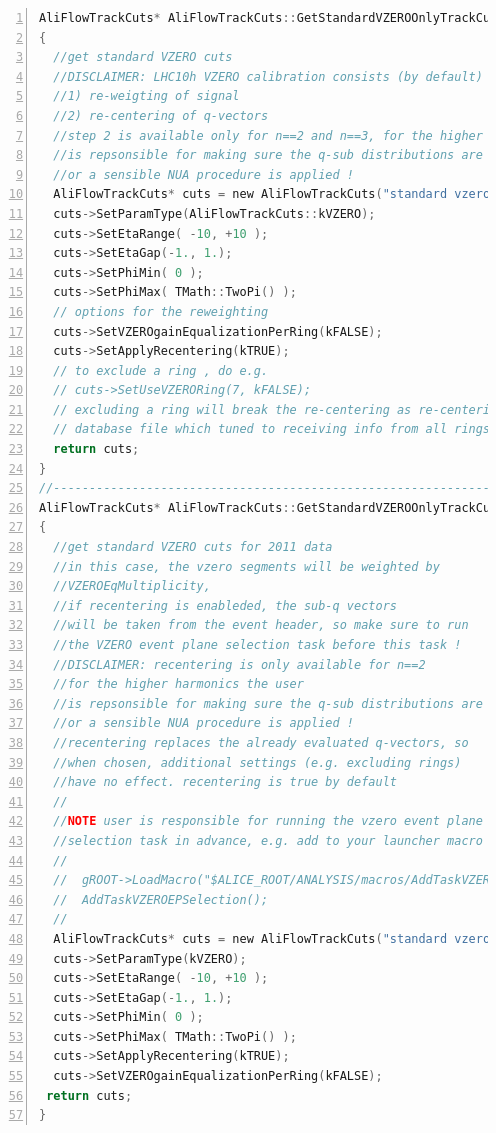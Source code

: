 \documentclass[a4paper]{book}
\numberwithin{equation}{subsection}
\begin{document}
\begin{lstlisting}[language=C, numbers=left]
AliFlowTrackCuts* AliFlowTrackCuts::GetStandardVZEROOnlyTrackCuts2010()
{
  //get standard VZERO cuts
  //DISCLAIMER: LHC10h VZERO calibration consists (by default) of two steps
  //1) re-weigting of signal
  //2) re-centering of q-vectors
  //step 2 is available only for n==2 and n==3, for the higher harmonics the user
  //is repsonsible for making sure the q-sub distributions are (sufficiently) flat
  //or a sensible NUA procedure is applied !
  AliFlowTrackCuts* cuts = new AliFlowTrackCuts("standard vzero flow cuts");
  cuts->SetParamType(AliFlowTrackCuts::kVZERO);
  cuts->SetEtaRange( -10, +10 );
  cuts->SetEtaGap(-1., 1.);
  cuts->SetPhiMin( 0 );
  cuts->SetPhiMax( TMath::TwoPi() );
  // options for the reweighting
  cuts->SetVZEROgainEqualizationPerRing(kFALSE);
  cuts->SetApplyRecentering(kTRUE);
  // to exclude a ring , do e.g. 
  // cuts->SetUseVZERORing(7, kFALSE);
  // excluding a ring will break the re-centering as re-centering relies on a 
  // database file which tuned to receiving info from all rings
  return cuts;
}
//-----------------------------------------------------------------------
AliFlowTrackCuts* AliFlowTrackCuts::GetStandardVZEROOnlyTrackCuts2011()
{
  //get standard VZERO cuts for 2011 data
  //in this case, the vzero segments will be weighted by
  //VZEROEqMultiplicity, 
  //if recentering is enableded, the sub-q vectors
  //will be taken from the event header, so make sure to run 
  //the VZERO event plane selection task before this task !
  //DISCLAIMER: recentering is only available for n==2
  //for the higher harmonics the user
  //is repsonsible for making sure the q-sub distributions are (sufficiently) flat
  //or a sensible NUA procedure is applied !
  //recentering replaces the already evaluated q-vectors, so 
  //when chosen, additional settings (e.g. excluding rings) 
  //have no effect. recentering is true by default
  //
  //NOTE user is responsible for running the vzero event plane
  //selection task in advance, e.g. add to your launcher macro
  //
  //  gROOT->LoadMacro("$ALICE_ROOT/ANALYSIS/macros/AddTaskVZEROEPSelection.C");
  //  AddTaskVZEROEPSelection();
  //
  AliFlowTrackCuts* cuts = new AliFlowTrackCuts("standard vzero flow cuts 2011");
  cuts->SetParamType(kVZERO);
  cuts->SetEtaRange( -10, +10 );
  cuts->SetEtaGap(-1., 1.);
  cuts->SetPhiMin( 0 );
  cuts->SetPhiMax( TMath::TwoPi() );
  cuts->SetApplyRecentering(kTRUE);
  cuts->SetVZEROgainEqualizationPerRing(kFALSE);
 return cuts;
}\end{lstlisting}
\end{document}
